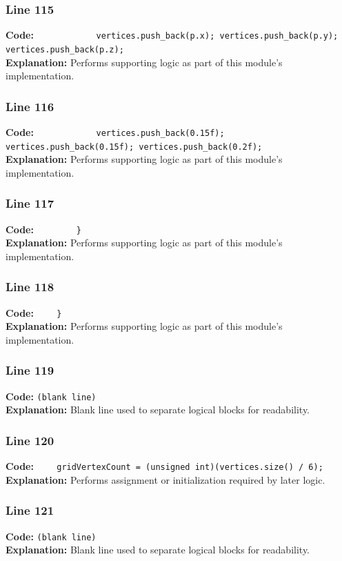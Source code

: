 \documentclass[11pt,a4paper]{article}
\begin{document}
\subsubsection*{Line 115}
\textbf{Code:} \verb|            vertices.push_back(p.x); vertices.push_back(p.y); vertices.push_back(p.z);|\\
\textbf{Explanation:} Performs supporting logic as part of this module's implementation.

\subsubsection*{Line 116}
\textbf{Code:} \verb|            vertices.push_back(0.15f); vertices.push_back(0.15f); vertices.push_back(0.2f);|\\
\textbf{Explanation:} Performs supporting logic as part of this module's implementation.

\subsubsection*{Line 117}
\textbf{Code:} \verb|        }|\\
\textbf{Explanation:} Performs supporting logic as part of this module's implementation.

\subsubsection*{Line 118}
\textbf{Code:} \verb|    }|\\
\textbf{Explanation:} Performs supporting logic as part of this module's implementation.

\subsubsection*{Line 119}
\textbf{Code:} \texttt{(blank line)}\\
\textbf{Explanation:} Blank line used to separate logical blocks for readability.

\subsubsection*{Line 120}
\textbf{Code:} \verb|    gridVertexCount = (unsigned int)(vertices.size() / 6);|\\
\textbf{Explanation:} Performs assignment or initialization required by later logic.

\subsubsection*{Line 121}
\textbf{Code:} \texttt{(blank line)}\\
\textbf{Explanation:} Blank line used to separate logical blocks for readability.
\end{document}
